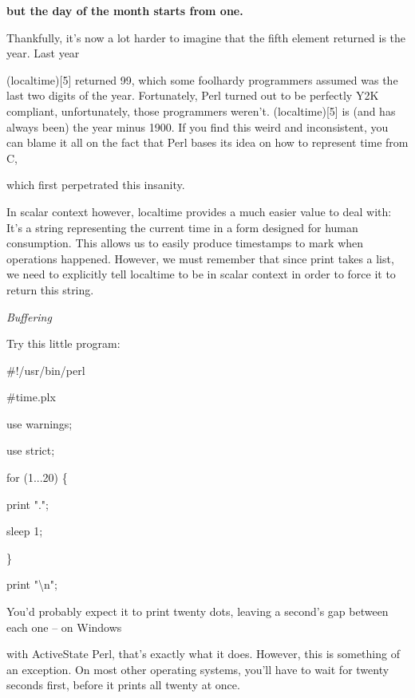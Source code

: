 \documentclass[a4paper,11pt]{book}
\begin{document}
\noindent \textbf{but the day of the month starts from one.}

\noindent 

\noindent 

\noindent Thankfully, it's now a lot harder to imagine that the fifth element returned is the year. Last year

\noindent (localtime)[5] returned 99, which some foolhardy programmers assumed was the last two digits of the year. Fortunately, Perl turned out to be perfectly Y2K compliant, unfortunately, those programmers weren't. (localtime)[5] is (and has always been) the year minus 1900. If you find this weird and inconsistent, you can blame it all on the fact that Perl bases its idea on how to represent time from C,

\noindent which first perpetrated this insanity.

\noindent 

\noindent In scalar context however, localtime provides a much easier value to deal with: It's a string representing the current time in a form designed for human consumption. This allows us to easily produce timestamps to mark when operations happened. However, we must remember that since print takes a list, we need to explicitly tell localtime to be in scalar context in order to force it to return this string.

\noindent 

\noindent \textit{Buffering}

\noindent Try this little program:

\noindent 

\noindent \#!/usr/bin/perl

\noindent \#time.plx

\noindent use warnings;

\noindent use strict;

\noindent 

\noindent for (1...20) \{

\noindent print ".";

\noindent sleep 1;

\noindent \}

\noindent print "\textbackslash n";

\noindent 

\noindent 

\noindent You'd probably expect it to print twenty dots, leaving a second's gap between each one -- on Windows

\noindent with ActiveState Perl, that's exactly what it does. However, this is something of an exception. On most other operating systems, you'll have to wait for twenty seconds first, before it prints all twenty at once.
\end{document}
